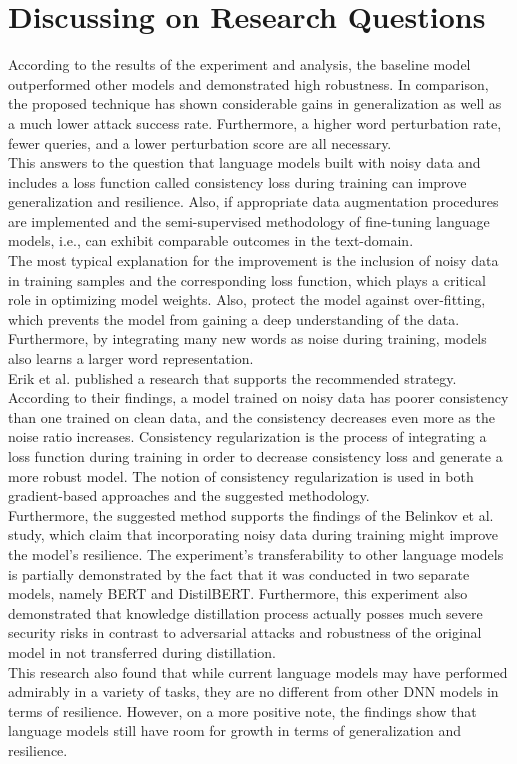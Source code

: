 \documentclass[%
	BCOR=8mm, %
	DIV=12,
	toc=bibliography, %
	toc=listof, %
	oneside, %
	egregdoesnotlikesansseriftitles, %
	]{scrbook}
\begin{document}
\section{Discussing on Research Questions}
According to the results of the experiment and analysis, the baseline model outperformed other models and demonstrated high robustness. In comparison, the proposed technique has shown considerable gains in generalization as well as a much lower attack success rate. Furthermore, a higher word perturbation rate, fewer queries, and a lower perturbation score are all necessary.\\
This answers to the question that language models built with noisy data and includes a loss function called consistency loss during training can improve generalization and resilience. Also, if appropriate data augmentation procedures are implemented and the semi-supervised methodology of fine-tuning language models, i.e., can exhibit comparable outcomes in the text-domain.\\
The most typical explanation for the improvement is the inclusion of noisy data in training samples and the corresponding loss function, which plays a critical role in optimizing model weights. Also, protect the model against over-fitting, which prevents the model from gaining a deep understanding of the data. Furthermore, by integrating many new words as noise during training, models also learns a larger word representation. \\
Erik et al. \cite{englesson_consistency_2021} published a research that supports the recommended strategy. According to their findings, a model trained on noisy data has poorer consistency than one trained on clean data, and the consistency decreases even more as the noise ratio increases. Consistency regularization is the process of integrating a loss function during training in order to decrease consistency loss and generate a more robust model. The notion of consistency regularization is used in both gradient-based approaches \cite{miyato_adversarial_2017} and the suggested methodology.\\
Furthermore, the suggested method supports the findings of the Belinkov et al.\cite{belinkov_synthetic_2018} study, which claim that incorporating noisy data during training might improve the model's resilience. The experiment's transferability to other language models is partially demonstrated by the fact that it was conducted in two separate models, namely BERT and DistilBERT. Furthermore, this experiment also demonstrated that knowledge distillation process actually posses much severe security risks in contrast to adversarial attacks and robustness of the original model in not transferred during distillation.\\
This research also found that while current language models may have performed admirably in a variety of tasks, they are no different from other DNN models in terms of resilience. However, on a more positive note, the findings show that language models still have room for growth in terms of generalization and resilience.
\end{document}
